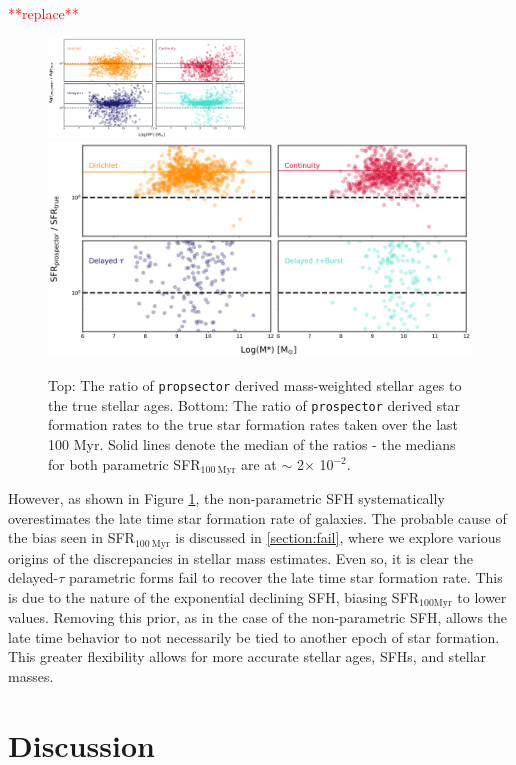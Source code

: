 \documentclass[twocolumn]{aastex62}
\begin{document}
\textcolor{red}{**replace**}
\begin{figure}[h]

\centering
\includegraphics[width=0.47\textwidth]{ages_comp.png}\hfill
\includegraphics[width=.47\textwidth]{sfr_comp_grid_M.png}

\caption{Top: The ratio of \texttt{propsector} derived mass-weighted stellar ages to the true stellar ages. Bottom: The ratio of \texttt{prospector} derived star formation rates to the true star formation rates taken over the last 100 Myr. Solid lines denote the median of the ratios - the medians for both parametric SFR$_{100 \: \mathrm{Myr}}$ are at $\sim$ 2$\times$ 10$^{-2}$.}
\label{fig:age_sfr}

\end{figure}

However, as shown in Figure \ref{fig:age_sfr}, the non-parametric SFH systematically overestimates the late time star formation rate of galaxies. The probable cause of the bias seen in SFR$_{100 \: \mathrm{Myr}}$ is discussed in \ref{section:fail}, where we explore various origins of the discrepancies in stellar mass estimates. Even so, it is clear the delayed-$\tau$ parametric forms fail to recover the late time star formation rate. This is due to the nature of the exponential declining SFH, biasing SFR$_{100 \mathrm{Myr}}$ to lower values. Removing this prior, as in the case of the non-parametric SFH, allows the late time behavior to not necessarily be tied to another epoch of star formation. This greater flexibility allows for more accurate stellar ages, SFHs, and stellar masses. 


\section{Discussion}
\end{document}
